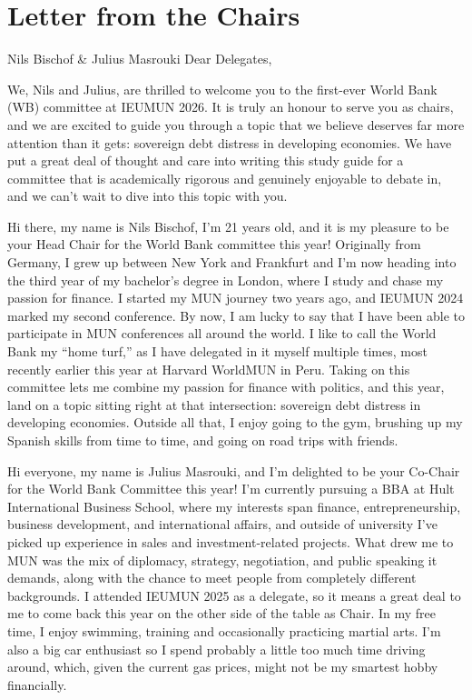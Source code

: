 \section{Letter from the Chairs}

\begin{chairletter}{Nils Bischof \& Julius Masrouki}
Dear Delegates,

We, Nils and Julius, are thrilled to welcome you to the first-ever World Bank (WB) committee at IEUMUN 2026. It is truly an honour to serve you as chairs, and we are excited to guide you through a topic that we believe deserves far more attention than it gets: sovereign debt distress in developing economies. We have put a great deal of thought and care into writing this study guide for a committee that is academically rigorous and genuinely enjoyable to debate in, and we can’t wait to dive into this topic with you.

Hi there, my name is Nils Bischof, I’m 21 years old, and it is my pleasure to be your Head Chair for the World Bank committee this year! Originally from Germany, I grew up between New York and Frankfurt and I’m now heading into the third year of my bachelor’s degree in London, where I study and chase my passion for finance. I started my MUN journey two years ago, and IEUMUN 2024 marked my second conference. By now, I am lucky to say that I have been able to participate in MUN conferences all around the world. I like to call the World Bank my “home turf,” as I have delegated in it myself multiple times, most recently earlier this year at Harvard WorldMUN in Peru. Taking on this committee lets me combine my passion for finance with politics, and this year, land on a topic sitting right at that intersection: sovereign debt distress in developing economies. Outside all that, I enjoy going to the gym, brushing up my Spanish skills from time to time, and going on road trips with friends.

Hi everyone, my name is Julius Masrouki, and I’m delighted to be your Co-Chair for the World Bank Committee this year! I’m currently pursuing a BBA at Hult International Business School, where my interests span finance, entrepreneurship, business development, and international affairs, and outside of university I’ve picked up experience in sales and investment-related projects. What drew me to MUN was the mix of diplomacy, strategy, negotiation, and public speaking it demands, along with the chance to meet people from completely different backgrounds. I attended IEUMUN 2025 as a delegate, so it means a great deal to me to come back this year on the other side of the table as Chair. In my free time, I enjoy swimming, training and occasionally practicing martial arts. I’m also a big car enthusiast so I spend probably a little too much time driving around, which, given the current gas prices, might not be my smartest hobby financially.


\end{chairletter}
